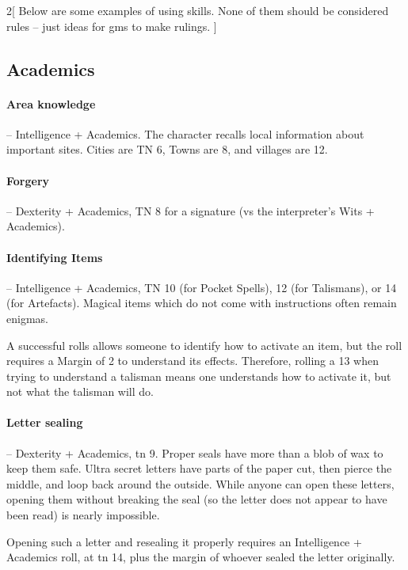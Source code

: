 \begin{multicols}{2}[
  Below are some examples of using skills.
  None of them should be considered rules -- just ideas for \glspl{gm} to make rulings.
]

\subsection{Academics}

\paragraph{Area knowledge } -- Intelligence + Academics.
The character recalls local information about important sites.
Cities are TN 6, Towns are 8, and villages are 12.

\paragraph{Forgery} -- Dexterity + Academics, TN 8 for a signature (vs the interpreter's Wits + Academics).

\label{magicidentification}
\paragraph{Identifying Items} -- Intelligence + Academics, TN 10 (for Pocket Spells), 12 (for Talismans), or 14 (for Artefacts).
Magical items which do not come with instructions often remain enigmas.

A successful rolls allows someone to identify how to activate an item, but the roll requires a Margin of 2 to understand its effects.
Therefore, rolling a 13 when trying to understand a talisman means one understands how to activate it, but not what the talisman will do.

\paragraph{Letter sealing} -- Dexterity + Academics, \gls{tn} 9.
\label{letterSealing}
Proper seals have more than a blob of wax to keep them safe.
Ultra secret letters have parts of the paper cut, then pierce the middle, and loop back around the outside.
While anyone can open these letters, opening them without breaking the seal (so the letter does not appear to have been read) is nearly impossible.

Opening such a letter and resealing it properly requires an Intelligence + Academics roll, at \gls{tn} 14, plus the margin of whoever sealed the letter originally.


\end{multicols}

